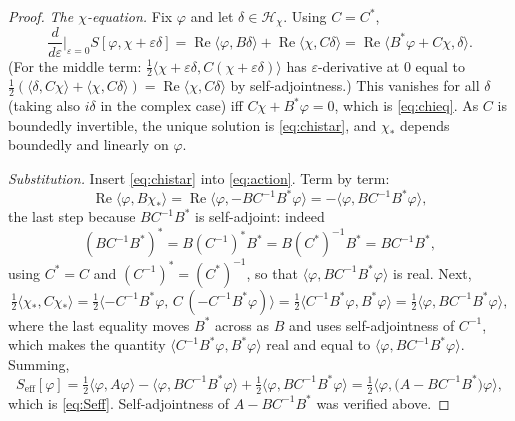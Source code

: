 \documentclass[11pt,reqno]{amsart}
\numberwithin{equation}{section}
\theoremstyle{plain}
\theoremstyle{definition}
\theoremstyle{remark}
\newcommand{\Seff}{S_{\mathrm{eff}}}
\newcommand{\inner}[2]{\langle #1 , #2 \rangle}
\begin{document}
\begin{proof}
\emph{The $\chi$-equation.} Fix $\varphi$ and let $\delta\in\mathcal{H}_{\chi}$. Using
$C=C^{*}$,
\[
\frac{d}{d\varepsilon}\bigg|_{\varepsilon=0}S[\varphi,\chi+\varepsilon\delta]
=\operatorname{Re}\inner{\varphi}{B\delta}+\operatorname{Re}\inner{\chi}{C\delta}
=\operatorname{Re}\inner{B^{*}\varphi+C\chi}{\delta} .
\]
(For the middle term: $\tfrac12\inner{\chi+\varepsilon\delta}{C(\chi+\varepsilon\delta)}$ has
$\varepsilon$-derivative at $0$ equal to
$\tfrac12(\inner{\delta}{C\chi}+\inner{\chi}{C\delta})=\operatorname{Re}\inner{\chi}{C\delta}$
by self-adjointness.) This vanishes for all $\delta$ (taking also $i\delta$ in the complex
case) iff $C\chi+B^{*}\varphi=0$, which is \eqref{eq:chieq}. As $C$ is boundedly invertible,
the unique solution is \eqref{eq:chistar}, and $\chi_{*}$ depends boundedly and linearly on
$\varphi$.

\emph{Substitution.} Insert \eqref{eq:chistar} into \eqref{eq:action}. Term by term:
\[
\operatorname{Re}\inner{\varphi}{B\chi_{*}}
=\operatorname{Re}\inner{\varphi}{-BC^{-1}B^{*}\varphi}
=-\inner{\varphi}{BC^{-1}B^{*}\varphi},
\]
the last step because $BC^{-1}B^{*}$ is self-adjoint: indeed
\[
(BC^{-1}B^{*})^{*}=B(C^{-1})^{*}B^{*}=B(C^{*})^{-1}B^{*}=BC^{-1}B^{*},
\]
using $C^{*}=C$ and $(C^{-1})^{*}=(C^{*})^{-1}$, so that
$\inner{\varphi}{BC^{-1}B^{*}\varphi}$ is real. Next,
\[
\tfrac12\inner{\chi_{*}}{C\chi_{*}}
=\tfrac12\inner{-C^{-1}B^{*}\varphi}{\,C\,(-C^{-1}B^{*}\varphi)}
=\tfrac12\inner{C^{-1}B^{*}\varphi}{B^{*}\varphi}
=\tfrac12\inner{\varphi}{BC^{-1}B^{*}\varphi},
\]
where the last equality moves $B^{*}$ across as $B$ and uses self-adjointness
of $C^{-1}$, which makes the quantity
$\inner{C^{-1}B^{*}\varphi}{B^{*}\varphi}$ real and equal to
$\inner{\varphi}{BC^{-1}B^{*}\varphi}$. Summing,
\[
\Seff[\varphi]
=\tfrac12\inner{\varphi}{A\varphi}
-\inner{\varphi}{BC^{-1}B^{*}\varphi}
+\tfrac12\inner{\varphi}{BC^{-1}B^{*}\varphi}
=\tfrac12\inner{\varphi}{\bigl(A-BC^{-1}B^{*}\bigr)\varphi},
\]
which is \eqref{eq:Seff}. Self-adjointness of $A-BC^{-1}B^{*}$ was verified above.
\end{proof}
\end{document}
